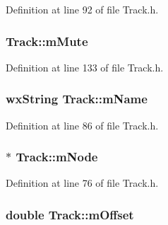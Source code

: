 Definition at line 92 of file Track.\+h.

\subsubsection[{\texorpdfstring{m\+Mute}{mMute}}]{ Track\+::m\+Mute\hspace{0.3cm}{\ttfamily [protected]}}\hypertarget{class_track_a633f85ffde8eda30576b00ee4115570c}{}\label{class_track_a633f85ffde8eda30576b00ee4115570c}


Definition at line 133 of file Track.\+h.

\subsubsection[{\texorpdfstring{m\+Name}{mName}}]{\setlength{\rightskip}{0pt plus 5cm}wx\+String Track\+::m\+Name\hspace{0.3cm}{\ttfamily [protected]}}\hypertarget{class_track_a885c04ed00a08ddaa6a3b2d72c55b384}{}\label{class_track_a885c04ed00a08ddaa6a3b2d72c55b384}


Definition at line 86 of file Track.\+h.

\subsubsection[{\texorpdfstring{m\+Node}{mNode}}]{$\ast$ Track\+::m\+Node\hspace{0.3cm}{\ttfamily [protected]}}\hypertarget{class_track_a405067641c56a9f23eef63ad646db8f9}{}\label{class_track_a405067641c56a9f23eef63ad646db8f9}


Definition at line 76 of file Track.\+h.

\subsubsection[{\texorpdfstring{m\+Offset}{mOffset}}]{\setlength{\rightskip}{0pt plus 5cm}double Track\+::m\+Offset\hspace{0.3cm}{\ttfamily [protected]}}\hypertarget{class_track_a561704af11450071df74b62498a54d1a}{}\label{class_track_a561704af11450071df74b62498a54d1a}


